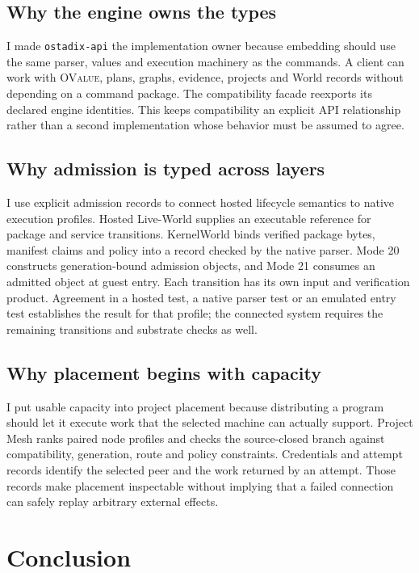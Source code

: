 \documentclass[11pt,oneside]{article}
\newcommand{\ovalue}{{\mdseries\textsc{OValue}}}
\begin{document}
\subsection{Why the engine owns the types}

I made \texttt{ostadix-api} the implementation owner because embedding should
use the same parser, values and execution machinery as the commands. A client
can work with \ovalue{}, plans, graphs, evidence, projects and World records
without depending on a command package. The compatibility facade reexports
its declared engine identities. This keeps compatibility an explicit API
relationship rather than a second implementation whose behavior must be
assumed to agree.

\subsection{Why admission is typed across layers}

I use explicit admission records to connect hosted lifecycle semantics to
native execution profiles. Hosted Live-World supplies an executable reference
for package and service transitions. KernelWorld binds verified package bytes,
manifest claims and policy into a record checked by the native parser.
Mode 20 constructs generation-bound admission objects, and Mode 21 consumes an
admitted object at guest entry. Each transition has its own input and
verification product. Agreement in a hosted test, a native parser test or an
emulated entry test establishes the result for that profile; the connected
system requires the remaining transitions and substrate checks as well.

\subsection{Why placement begins with capacity}

I put usable capacity into project placement because distributing a program
should let it execute work that the selected machine can actually support.
Project Mesh ranks paired node profiles and checks the source-closed branch
against compatibility, generation, route and policy constraints. Credentials
and attempt records identify the selected peer and the work returned by an
attempt. Those records make placement inspectable without implying that a
failed connection can safely replay arbitrary external effects.

\section{Conclusion}
\end{document}

